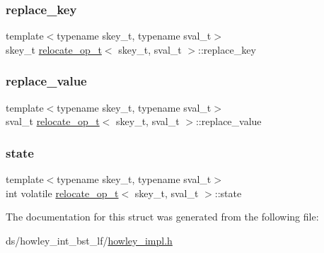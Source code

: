 \subsubsection{\texorpdfstring{replace\+\_\+key}{replace\_key}}
{\footnotesize\ttfamily template$<$typename skey\+\_\+t, typename sval\+\_\+t$>$ \\
skey\+\_\+t \hyperlink{structrelocate__op__t}{relocate\+\_\+op\+\_\+t}$<$ skey\+\_\+t, sval\+\_\+t $>$\+::replace\+\_\+key}

\mbox{\label{structrelocate__op__t_a21914d54d59383b2809d373991ddd758}} 
\subsubsection{\texorpdfstring{replace\+\_\+value}{replace\_value}}
{\footnotesize\ttfamily template$<$typename skey\+\_\+t, typename sval\+\_\+t$>$ \\
sval\+\_\+t \hyperlink{structrelocate__op__t}{relocate\+\_\+op\+\_\+t}$<$ skey\+\_\+t, sval\+\_\+t $>$\+::replace\+\_\+value}

\mbox{\label{structrelocate__op__t_ab80ba78746bcd22f3cad9362d90694b5}} 
\subsubsection{\texorpdfstring{state}{state}}
{\footnotesize\ttfamily template$<$typename skey\+\_\+t, typename sval\+\_\+t$>$ \\
int volatile \hyperlink{structrelocate__op__t}{relocate\+\_\+op\+\_\+t}$<$ skey\+\_\+t, sval\+\_\+t $>$\+::state}



The documentation for this struct was generated from the following file\+:\begin{DoxyCompactItemize}
\item 
ds/howley\+\_\+int\+\_\+bst\+\_\+lf/\hyperlink{howley__impl_8h}{howley\+\_\+impl.\+h}\end{DoxyCompactItemize}
